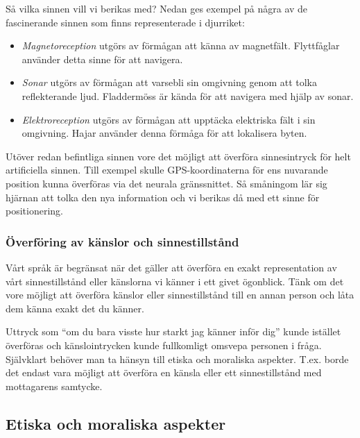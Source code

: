 \documentclass[12pt, a4paper]{article}
\begin{document}
Så vilka sinnen vill vi berikas med? Nedan ges exempel på några av de
fascinerande sinnen som finns representerade i djurriket:

\begin{itemize}
	\item \textit{Magnetoreception} utgörs av förmågan att känna av magnetfält.
	Flyttfåglar använder detta sinne för att navigera.
	\item \textit{Sonar} utgörs av förmågan att varsebli sin omgivning genom att
	tolka reflekterande ljud. Fladdermöss är kända för att navigera med hjälp av
	sonar.
	\item \textit{Elektroreception} utgörs av förmågan att upptäcka elektriska
	fält i sin omgivning. Hajar använder denna förmåga för att lokalisera byten.
\end{itemize}

Utöver redan befintliga sinnen vore det möjligt att överföra sinnesintryck för
helt artificiella sinnen. Till exempel skulle GPS-koordinaterna för ens
nuvarande position kunna överföras via det neurala gränssnittet. Så småningom
lär sig hjärnan att tolka den nya information och vi berikas då med ett sinne
för positionering.

\subsubsection{Överföring av känslor och sinnestillstånd}

Vårt språk är begränsat när det gäller att överföra en exakt representation av
vårt sinnestillstånd eller känslorna vi känner i ett givet ögonblick. Tänk om
det vore möjligt att överföra känslor eller sinnestillstånd till en annan person
och låta dem känna exakt det du känner.

Uttryck som ``om du bara visste hur starkt jag känner inför dig'' kunde istället
överföras och känslointrycken kunde fullkomligt omsvepa personen i fråga.
Självklart behöver man ta hänsyn till etiska och moraliska aspekter. T.ex. borde
det endast vara möjligt att överföra en känsla eller ett sinnestillstånd med
mottagarens samtycke.


\subsection{Etiska och moraliska aspekter}

\end{document}
